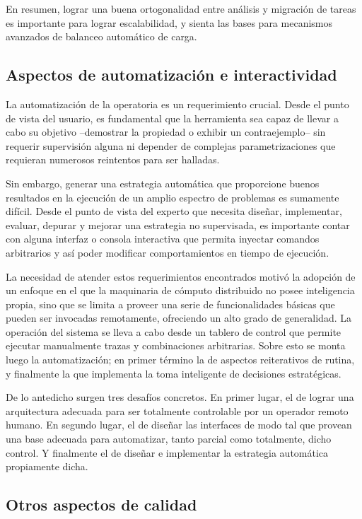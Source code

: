 En resumen, lograr una buena ortogonalidad entre análisis y migración de tareas es
importante para lograr escalabilidad, y sienta las bases para mecanismos
avanzados de balanceo automático de carga.



\subsection{Aspectos de automatización e interactividad}

La automatización de la operatoria es un requerimiento crucial. Desde el punto
de vista del usuario, es fundamental que la herramienta sea capaz de llevar a
cabo su objetivo --demostrar la propiedad o exhibir un contraejemplo-- sin requerir
supervisión alguna ni depender de complejas parametrizaciones que requieran
numerosos reintentos para ser halladas.

Sin embargo, generar una estrategia automática que proporcione buenos resultados
en la ejecución de un amplio espectro de problemas es sumamente difícil. Desde el
punto de vista del experto que necesita diseñar, implementar, evaluar, depurar y
mejorar una estrategia no supervisada, es importante contar con alguna
interfaz o consola interactiva que permita inyectar comandos arbitrarios y
así poder modificar comportamientos en tiempo de ejecución.

La necesidad de atender estos requerimientos encontrados motivó la adopción de
un enfoque en el que la maquinaria de cómputo distribuido no posee inteligencia
propia, sino que se limita a proveer una serie de funcionalidades básicas que
pueden ser invocadas remotamente, ofreciendo un alto grado de generalidad. La
operación del sistema se lleva a cabo desde un tablero de control que permite
ejecutar manualmente trazas y combinaciones arbitrarias. Sobre esto se monta
luego la automatización; en primer término la de aspectos reiterativos de rutina,
y finalmente la que implementa la toma inteligente de decisiones estratégicas.

De lo antedicho surgen tres desafíos concretos. En primer lugar, el de lograr una
arquitectura adecuada para ser totalmente controlable por un operador remoto humano.
En segundo lugar, el de diseñar las interfaces de modo tal que provean una base adecuada
para automatizar, tanto parcial como totalmente, dicho control. Y finalmente el de
diseñar e implementar la estrategia automática propiamente dicha.


\subsection{Otros aspectos de calidad}


